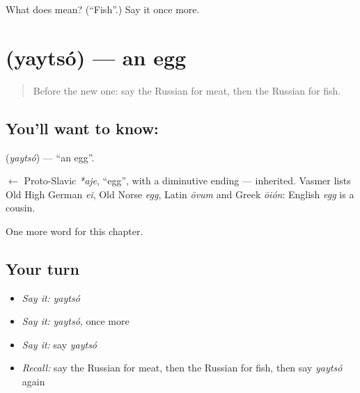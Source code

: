 \begin{tcolorbox}[breakable,colback=teal!4,colframe=teal!35!black,title={Before you move on}]
What does  mean? (\textquotedblleft{}Fish\textquotedblright{}.) Say it once more.
\end{tcolorbox}
\section[\texorpdfstring{\ru{яйцо} (yaytsó)}{яйцо (yaytsó)}]{ (yaytsó) — an egg}

\label{lesson:RU-C43-egg}



\begin{quote}
Before the new one: say the Russian for meat, then the Russian for fish.
\end{quote}

\subsection*{You'll want to know: }
\textbf{} (\emph{yaytsó}) — \textquotedblleft{}an egg\textquotedblright{}.

\begin{cousinweb}
\textbf{} $\leftarrow$ Proto-Slavic \emph{*aje}, \textquotedblleft{}egg\textquotedblright{}, with a diminutive ending — inherited. Vasmer lists Old High German \emph{ei}, Old Norse \emph{egg}, Latin \emph{ōvum} and Greek \emph{ōión}: English \emph{egg} is a cousin.
\end{cousinweb}

\begin{grammarlens}[title={What you've built}]
One more word for this chapter.
\end{grammarlens}

\subsection*{Your turn}
\begin{itemize}
\raggedright
  \item \emph{Say it:} \emph{yaytsó}
  \item \emph{Say it:} \emph{yaytsó}, once more
  \item \emph{Say it:} say \emph{yaytsó}
  \item \emph{Recall:} say the Russian for meat, then the Russian for fish, then say \emph{yaytsó} again
\end{itemize}

